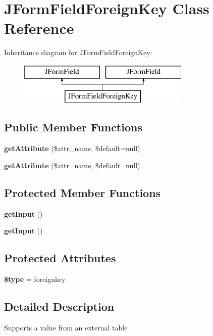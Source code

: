 \section{J\+Form\+Field\+Foreign\+Key Class Reference}
\label{class_j_form_field_foreign_key}
Inheritance diagram for J\+Form\+Field\+Foreign\+Key\+:\begin{figure}[H]
\begin{center}
\leavevmode
\includegraphics[height=2.000000cm]{class_j_form_field_foreign_key}
\end{center}
\end{figure}
\subsection*{Public Member Functions}
\begin{DoxyCompactItemize}
\item 
\textbf{ get\+Attribute} (\$attr\+\_\+name, \$default=null)
\item 
\textbf{ get\+Attribute} (\$attr\+\_\+name, \$default=null)
\end{DoxyCompactItemize}
\subsection*{Protected Member Functions}
\begin{DoxyCompactItemize}
\item 
\textbf{ get\+Input} ()
\item 
\textbf{ get\+Input} ()
\end{DoxyCompactItemize}
\subsection*{Protected Attributes}
\begin{DoxyCompactItemize}
\item 
\textbf{ \$type} = \textquotesingle{}foreignkey\textquotesingle{}
\end{DoxyCompactItemize}


\subsection{Detailed Description}
Supports a value from an external table

